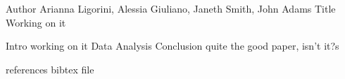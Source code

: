 
Author Arianna Ligorini, Alessia Giuliano, Janeth Smith, John Adams 
Title Working on it


Intro working on it
Data
Analysis
Conclusion quite the good paper, isn't it?s


references
bibtex file
